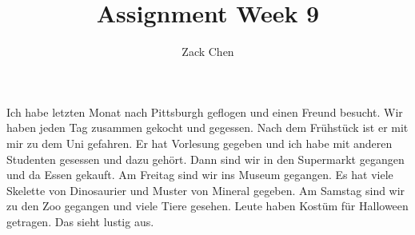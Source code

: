 \documentclass{article}
\title{Assignment Week 9}
\author{Zack Chen}
\begin{document}
\maketitle

Ich habe letzten Monat nach Pittsburgh geflogen und einen Freund besucht.
Wir haben jeden Tag zusammen gekocht und gegessen.
Nach dem Fr\"uhst\"uck ist er mit mir zu dem Uni gefahren.
Er hat Vorlesung gegeben und ich habe mit anderen Studenten gesessen und dazu geh\"ort.
Dann sind wir in den Supermarkt gegangen und da Essen gekauft.
Am Freitag sind wir ins Museum gegangen.
Es hat viele Skelette von Dinosaurier und Muster von Mineral gegeben.
Am Samstag sind wir zu den Zoo gegangen und viele Tiere gesehen.
Leute haben Kost\"um f\"ur Halloween getragen.
Das sieht lustig aus.


% 
% 
\end{document}
